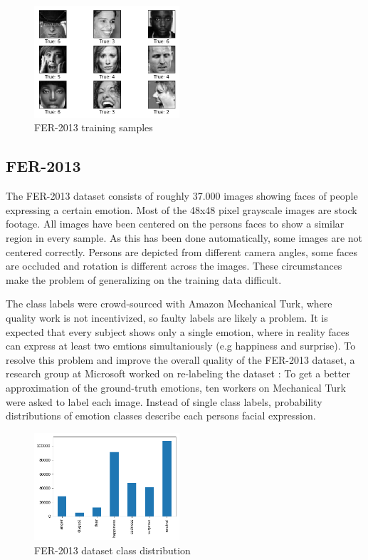 \documentclass[twoside]{article}
\begin{document}
\begin{multicols}{2}
\begin{figure}[H]
	\includegraphics[width=0.48\textwidth]{fer_examples}
	\caption{FER-2013 training samples}
\end{figure}


\subsection{FER-2013}
The FER-2013 dataset consists of roughly 37.000 images showing faces of people expressing a certain emotion. Most of the 48x48 pixel grayscale images are stock footage. All images have been centered on the persons faces to show a similar region in every sample. As this has been done automatically, some images are not centered correctly. Persons are depicted from different camera angles, some faces are occluded and rotation is different across the images. These circumstances make the problem of generalizing on the training data difficult. 

The class labels were crowd-sourced with Amazon Mechanical Turk, where quality work is not incentivized, so faulty labels are likely a problem. It is expected that every subject shows only a single emotion, where in reality faces can express at least two emtions simultaniously (e.g happiness and surprise). To resolve this problem and improve the overall quality of the FER-2013 dataset, a research group at Microsoft worked on re-labeling the dataset \cite{barsoum16}: To get a better approximation of the ground-truth emotions, ten workers on Mechanical Turk were asked to label each image. Instead of single class labels, probability distributions of emotion classes describe each persons facial expression.

\begin{figure}[H]
	\includegraphics[width=0.48\textwidth]{ferplus_distribution}
	\caption{FER-2013 dataset class distribution}
\end{figure}


\end{multicols}
\end{document}

